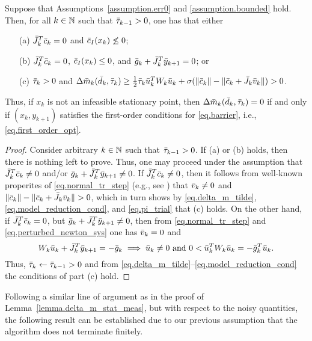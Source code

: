 \begin{lemma}\label{lemma.delta_m_stat_meas}
  Suppose that Assumptions~\ref{assumption.err0} and \ref{assumption.bounded} hold.  Then, for all $k \in \mathbb{N}$ such that ${\bar \tau}_{k-1} > 0$, one has that either
  \begin{enumerate}
    \item[(a)] ${\bar J}_k^T{\bar c}_k = 0$ and ${\bar c}_I(x_k) \not\leq 0$;
    \item[(b)] ${\bar J}_k^T{\bar c}_k = 0$, ${\bar c}_I(x_k) \leq 0$, and ${\bar g}_k + {\bar J}_k^T{\bar y}_{k+1} = 0$; or
    \item[(c)] ${\bar \tau}_k > 0$ and $\Delta {\bar m}_k({\bar d}_k, {\bar \tau}_k) \geq \tfrac12 {\bar \tau}_k {\bar u}_k^T W_k {\bar u}_k + \sigma (\|{\bar c}_k\| - \|{\bar c}_k + {\bar J}_k {\bar v}_k\|) > 0$.
  \end{enumerate}
  Thus, if $x_k$ is not an infeasible stationary point, then $\Delta {\bar m}_k({\bar d}_k, {\bar \tau}_k) = 0$ if and only if $(x_k,y_{k+1})$ satisfies the first-order conditions for \eqref{eq.barrier}, i.e., \eqref{eq.first_order_opt}.
\end{lemma}
\begin{proof}
  Consider arbitrary $k \in \mathbb{N}$ such that ${\bar \tau}_{k-1} > 0$.  If (a) or (b) holds, then there is nothing left to prove.  Thus, one may proceed under the assumption that ${\bar J}_k^T{\bar c}_k \neq 0$ and/or ${\bar g}_k + {\bar J}_k^T{\bar y}_{k+1} \neq 0$.  If ${\bar J}_k^T{\bar c}_k \neq 0$, then it follows from well-known properites of \eqref{eq.normal_tr_step} (e.g., see \cite{nocedal1999numerical}) that ${\bar v}_k \neq 0$ and $\|{\bar c}_k\| - \|{\bar c}_k + {\bar J}_k{\bar v}_k\| > 0$, which in turn shows by \eqref{eq.delta_m_tilde}, \eqref{eq.model_reduction_cond}, and \eqref{eq.pi_trial} that (c) holds.  On the other hand, if ${\bar J}_k^T{\bar c}_k = 0$, but ${\bar g}_k + {\bar J}_k^T{\bar y}_{k+1} \neq 0$, then from \eqref{eq.normal_tr_step} and \eqref{eq.perturbed_newton_sys} one has ${\bar v}_k = 0$ and
  \begin{equation*}
    W_k {\bar u}_k + {\bar J}_k^T {\bar y}_{k+1} = -{\bar g}_k \implies {\bar u}_k \neq 0\ \text{and}\ 0 < {\bar u}_k^TW_k{\bar u}_k = -{\bar g}_k^T{\bar u}_k.
  \end{equation*}
  Thus, ${\bar \tau}_k \gets {\bar \tau}_{k-1} > 0$ and from \eqref{eq.delta_m_tilde}--\eqref{eq.model_reduction_cond} the conditions of part (c) hold.
\end{proof} 

Following a similar line of argument as in the proof of Lemma~\ref{lemma.delta_m_stat_meas}, but with respect to the noisy quantities, the following result can be established due to our previous assumption that the algorithm does not terminate finitely.

